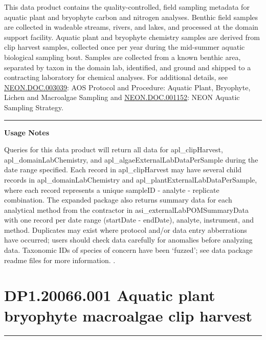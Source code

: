 \documentclass[]{article}
\begin{document}
This data product contains the quality-controlled, field sampling
metadata for aquatic plant and bryophyte carbon and nitrogen analyses.
Benthic field samples are collected in wadeable streams, rivers, and
lakes, and processed at the domain support facility. Aquatic plant and
bryophyte chemistry samples are derived from clip harvest samples,
collected once per year during the mid-summer aquatic biological
sampling bout. Samples are collected from a known benthic area,
separated by taxon in the domain lab, identified, and ground and shipped
to a contracting laboratory for chemical analyses. For additional
details, see
\href{http://data.neonscience.org/api/v0/documents/NEON.DOC.003039vB}{NEON.DOC.003039}:
AOS Protocol and Procedure: Aquatic Plant, Bryophyte, Lichen and
Macroalgae Sampling and
\href{http://data.neonscience.org/api/v0/documents/NEON.DOC.001152vA}{NEON.DOC.001152}:
NEON Aquatic Sampling Strategy.

\begin{center}\rule{0.5\linewidth}{\linethickness}\end{center}

\textbf{Usage Notes}

Queries for this data product will return all data for apl\_clipHarvest,
apl\_domainLabChemistry, and apl\_algaeExternalLabDataPerSample during
the date range specified. Each record in apl\_clipHarvest may have
several child records in apl\_domainLabChemistry and
apl\_plantExternalLabDataPerSample, where each record represents a
unique sampleID - analyte - replicate combination. The expanded package
also returns summary data for each analytical method from the contractor
in asi\_externalLabPOMSummaryData with one record per date range
(startDate - endDate), analyte, instrument, and method. Duplicates may
exist where protocol and/or data entry abberrations have occurred; users
should check data carefully for anomalies before analyzing data.
Taxonomic IDs of species of concern have been `fuzzed'; see data package
readme files for more information. \newpage
.

\section{DP1.20066.001 Aquatic plant bryophyte macroalgae clip
harvest}\label{dp1.20066.001-aquatic-plant-bryophyte-macroalgae-clip-harvest}

\begin{center}\rule{0.5\linewidth}{\linethickness}\end{center}
\end{document}
